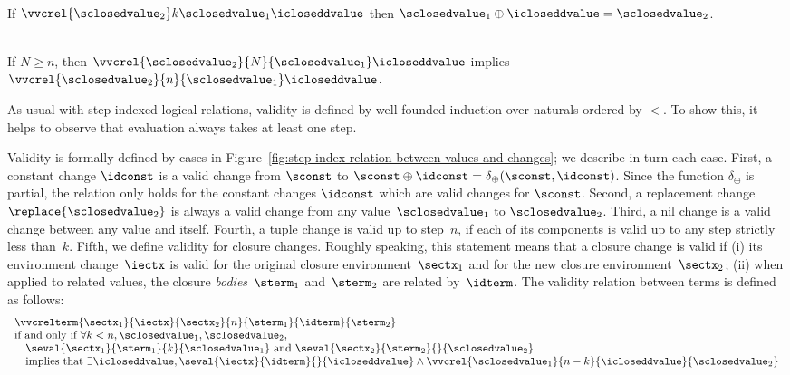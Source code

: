 \begin{lemma}
  \label{lemma:crel-oplus}
  \-\\
  If
  $\vvcrel {\sclosedvalue_2} k {\sclosedvalue_1} \icloseddvalue$ then
  $\sclosedvalue_1 \oplus \icloseddvalue = \sclosedvalue_2$.
\end{lemma}
\begin{lemma}
  \label{lemma:vvcrel-antimono}
  \-\\
  If $N \ge n$, then $\vvcrel{\sclosedvalue_2} {N} {\sclosedvalue_1} \icloseddvalue$ implies
  $\vvcrel{\sclosedvalue_2} {n} {\sclosedvalue_1} \icloseddvalue$.
\end{lemma}



As usual with step-indexed logical relations, validity is defined by
well-founded induction over naturals ordered by $<$. To show this, it helps to
observe that evaluation always takes at least one step.

Validity is formally defined by cases in
Figure~\ref{fig:step-index-relation-between-values-and-changes}; we
describe in turn each case. First, a constant change $\idconst$ is a
valid change from $\sconst$ to
$\sconst \oplus \idconst = \delta_{\oplus} (\sconst, \idconst)$.
Since the function $\delta_\oplus$ is partial, the relation only holds
for the constant changes $\idconst$ which are valid changes for
$\sconst$.
%
Second, a replacement change ${\replace{\sclosedvalue_2}}$ is always a valid
change from any value~$\sclosedvalue_1$ to $\sclosedvalue_2$.
%
Third, a nil change is a valid change between any value and itself.
%
Fourth, a tuple change is valid up to step~$n$, if each of its components
is valid up to any step strictly less than~$k$.
%
Fifth, we define validity for closure changes. Roughly
speaking, this statement means that a closure change is valid if (i)
its environment change~$\iectx$ is valid for the original closure
environment~$\sectx_1$ and for the new closure environment~$\sectx_2$;
(ii) when applied to related values, the closure \textit{bodies}~$\sterm_1$
and~$\sterm_2$ are related by~$\idterm$. The validity relation between
terms is defined as follows:
\[
\begin{array}{l}
  \vvcrelterm{\sectx_1}{\iectx}{\sectx_2}{n}{\sterm_1}{\idterm}{\sterm_2} \\
  \textrm{if and only if }
  \forall k < n, \sclosedvalue_1, \sclosedvalue_2, \\
  \quad\seval{\sectx_1}{\sterm_1}{k}{\sclosedvalue_1} \textrm{ and }
  \seval{\sectx_2}{\sterm_2}{}{\sclosedvalue_2} \\
  \quad\textrm{implies that } \exists \icloseddvalue,
  \seval{\iectx}{\idterm}{}{\icloseddvalue} \wedge
  \vvcrel{\sclosedvalue_1}{n - k}{\icloseddvalue}{\sclosedvalue_2}
\end{array}
\]

